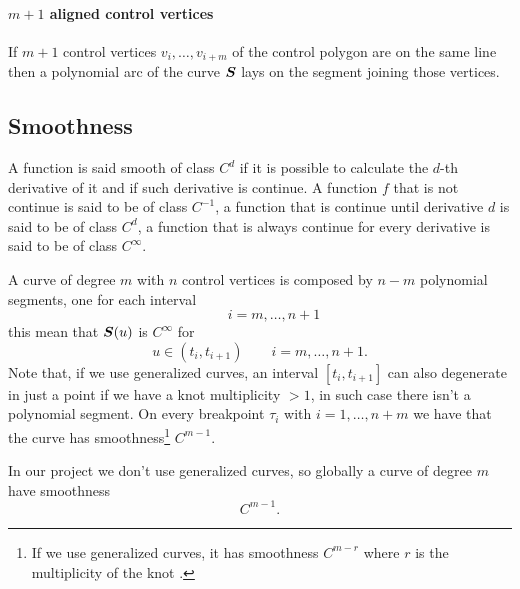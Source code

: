 \documentclass[dissertation.tex]{subfiles}
\begin{document}
\paragraph{$m+1$ aligned control vertices}
If $m+1$ control vertices $v_i,\dots,v_{i+m}$ of the control polygon
are on the same line then a polynomial arc of the curve $\boldsymbol{S}$
lays on the segment joining those vertices.

\subsection{Smoothness}\label{sec:smoothness}
A function is said smooth of class $C^d$ if it is possible to
calculate the $d$-th derivative of it and if such derivative is
continue. A function $f$ that is not continue is said to be of class
$C^{-1}$, a function that is continue until derivative $d$ is said to
be of class $C^d$, a function that is always continue for every
derivative is said to be of class $C^\infty$.

A \bs curve of degree $m$ with $n$ control vertices is composed by
$n-m$ polynomial segments, one for each 
interval 
\begin{equation*}
[t_i,t_{i+1}]\qquad i=m,\dots,n+1  
\end{equation*}
this mean that $\boldsymbol{S}(u)$ is $C^\infty$ for
\begin{equation*}
u\in(t_i,t_{i+1})\qquad i=m,\dots,n+1.
\end{equation*}
Note that, if we use generalized \bs curves, an interval
$[t_i,t_{i+1}]$ can also degenerate in just a point if
we have a knot multiplicity $>1$, in
such case there isn't a polynomial segment.
On every breakpoint $\tau_i$ with $i=1,\dots,n+m$ we have that the curve has
smoothness\footnote{If we use generalized \bs curves, it has
  smoothness $C^{m-r}$ where $r$ is the
multiplicity of the knot \cite{farin}.} $C^{m-1}$.

In our project we don't use generalized \bs curves, so globally a
curve of degree $m$ have smoothness
\begin{equation*}
  C^{m-1}.
\end{equation*}
\end{document}
